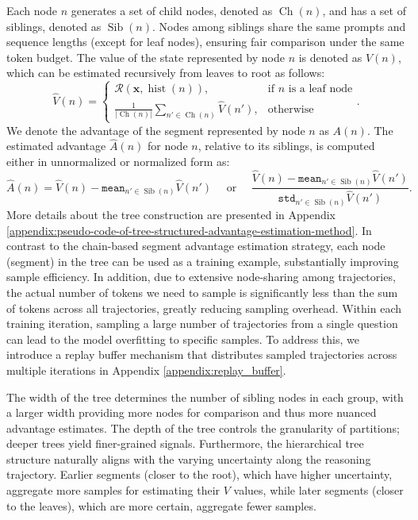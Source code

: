 Each node \(n\) generates a set of child nodes, denoted as \(\operatorname{Ch}(n)\), and has a set of siblings, denoted as \(\operatorname{Sib}(n)\). Nodes among siblings share the same prompts and sequence lengths (except for leaf nodes), ensuring fair comparison under the same token budget. The value of the state represented by node \( n \) is denoted as \(V(n)\), which can be estimated recursively from leaves to root as follows:
\[
\hat{V}(n) =
\begin{cases}
\mathcal{R}(\boldsymbol{x}, \operatorname{hist}(n)), & \text{if } n \text{ is a leaf node} \\
\frac{1}{|\operatorname{Ch}(n)|} \sum_{n' \in \operatorname{Ch}(n)} \hat{V}(n'), & \text{otherwise}
\end{cases}.
\]
We denote the advantage of the segment represented by node \( n \) as \( A(n) \). The estimated advantage \( \hat A(n) \) for node \( n \), relative to its siblings, is computed either in unnormalized or normalized form as:
\[ 
\hat{A}(n)= \hat{V}(n)-\texttt{mean}_{n'\in \operatorname{Sib}(n)}\hat{V}(n') \quad \text{ or } \quad  \frac{\hat{V}(n)-\texttt{mean}_{n'\in \operatorname{Sib}(n)}\hat{V}(n')}{\texttt{std}_{n'\in \operatorname{Sib}(n)}\hat{V}(n')}. 
\]
More details about the tree construction are presented in Appendix \ref{appendix:pseudo-code-of-tree-structured-advantage-estimation-method}. In contrast to the chain-based segment advantage estimation strategy, each node (segment) in the tree can be used as a training example, substantially improving sample efficiency. In addition, due to extensive node-sharing among trajectories, the actual number of tokens we need to sample is significantly less than the sum of tokens across all trajectories, greatly reducing sampling overhead. Within each training iteration, sampling a large number of trajectories from a single question can lead to the model overfitting to specific samples. To address this, we introduce a replay buffer mechanism that distributes sampled trajectories across multiple iterations in Appendix \ref{appendix:replay_buffer}.

The width of the tree determines the number of sibling nodes in each group, with a larger width providing more nodes for comparison and thus more nuanced advantage estimates. The depth of the tree controls the granularity of partitions; deeper trees yield finer-grained signals. Furthermore, the hierarchical tree structure naturally aligns with the varying uncertainty along the reasoning trajectory. Earlier segments (closer to the root), which have higher uncertainty, aggregate more samples for estimating their \(V\) values, while later segments (closer to the leaves), which are more certain, aggregate fewer samples.


